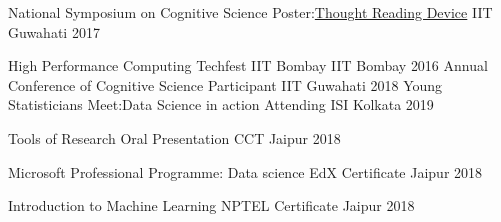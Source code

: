 
\vspace{-0.3cm}



\begin{cvhonors}


  \cvhonor
  {National Symposium on Cognitive Science} %
  {Poster:\underline{Thought Reading Device}} %
  {IIT Guwahati} %
  {2017} %

  \cvhonor
  {High Performance Computing}
  {Techfest IIT Bombay}
  {IIT Bombay}
  {2016}
  \cvhonor
  {Annual Conference of Cognitive Science} %
  {Participant}
  {IIT Guwahati} %
  {2018} %
  \cvhonor
  {Young Statisticians Meet:Data Science in action} %
  {Attending} %
  {ISI Kolkata} %
  {2019} %

  \cvhonor
  {Tools of Research}
  {Oral Presentation}
  {CCT Jaipur}
  {2018}

  \cvhonor
  {Microsoft Professional Programme: Data science}
  {EdX Certificate}
  {Jaipur}
  {2018}

  \cvhonor
  {Introduction to Machine Learning}
  {NPTEL Certificate}
  {Jaipur}
  {2018}




\end{cvhonors}

